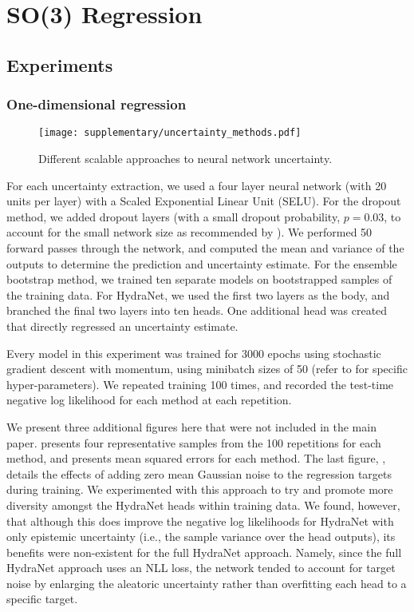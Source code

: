 \chapter{SO(3) Regression}
\label{chap:appendix_so3_learning}

\section{Experiments}
\subsection{One-dimensional regression}

\begin{figure*}
	\centering
	\texttt{[image: supplementary/uncertainty\_methods.pdf]}
	\vspace{-.5em}
	\caption{Different scalable approaches to neural network uncertainty. }
	\label{fig:nn-uncertainty}
\end{figure*}

For each uncertainty extraction, we used a four layer neural network (with 20 units per layer) with a Scaled Exponential Linear Unit (SELU). For the dropout method, we added dropout layers (with a small dropout probability, $p=0.03$, to account for the small network size as recommended by \cite{Gal2016-ny}). We performed 50 forward passes through the network, and computed the mean and variance of the outputs to determine the prediction and uncertainty estimate. For the ensemble bootstrap method, we trained ten separate models on bootstrapped samples of the training data. For HydraNet, we used the first two layers as the body, and branched the final two layers into ten heads.  One additional head was created that directly regressed an uncertainty estimate.  


Every model in this experiment was trained for 3000 epochs using stochastic gradient descent with momentum, using minibatch sizes of 50 (refer to  for specific hyper-parameters). We repeated training 100 times, and recorded the test-time negative log likelihood for each method at each repetition.


We present three additional figures here that were not included in the main paper.  presents four representative samples from the 100 repetitions for each method, and  presents mean squared errors for each method. The last figure, , details the effects of adding zero mean Gaussian noise to the regression targets during training. We experimented with this approach to try and promote more diversity amongst the HydraNet heads within training data. We found, however, that although this does improve the negative log likelihoods for HydraNet with only epistemic uncertainty (i.e., the sample variance over the head outputs), its benefits were non-existent for the full HydraNet approach. Namely, since the full HydraNet approach uses an NLL loss, the network tended to account for target noise by enlarging the aleatoric uncertainty rather than overfitting each head to a specific target.

